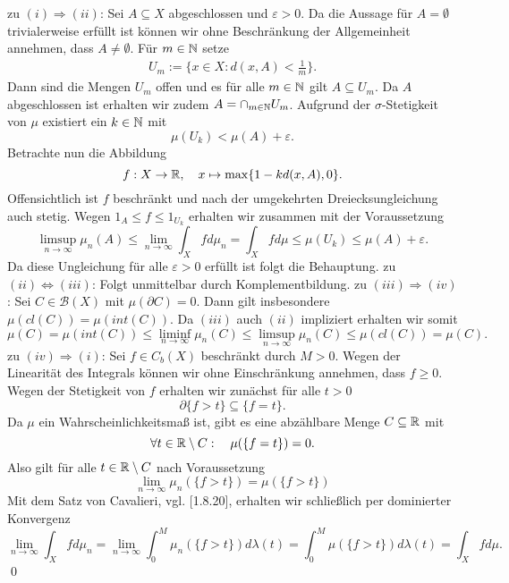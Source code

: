 \begin{proof*}
    zu $(i) \Rightarrow (ii)$: Sei $A \subseteq X$ abgeschlossen und $\varepsilon > 0$. Da die Aussage für $A = \emptyset$ trivialerweise erfüllt ist
    können wir ohne Beschränkung der Allgemeinheit annehmen, dass $A \neq \emptyset$. Für $m \in \mathbb{N}$ setze
    \begin{align*}
        U_m := \{x \in X: d(x,A) < \frac{1}{m}\}.
    \end{align*}
    Dann sind die Mengen $U_m$ offen und es für alle $m \in \mathbb{N}$ gilt $A \subseteq U_m$. Da $A$ abgeschlossen ist erhalten wir zudem $ A = \cap_{m \in \mathbb{N}} U_m$. 
    Aufgrund der $\sigma$-Stetigkeit von $\mu$ existiert ein $k \in \mathbb{N}$ mit 
    $$
        \mu(U_k) < \mu(A) + \varepsilon . 
    $$
    Betrachte nun die Abbildung 
    $$
        f:X \to \mathbb{R}, \quad x \mapsto \max\{1 - kd(x,A), 0\}.
    $$
    Offensichtlich ist $f$ beschränkt und nach der umgekehrten Dreiecksungleichung auch stetig. Wegen $1_A \leq f \leq 1_{U_k}$ erhalten wir zusammen mit der Voraussetzung 
    $$
    \limsup_{n \to \infty} \mu_n(A) \leq \lim_{n \to \infty} \int_X fd\mu_n = \int_X fd\mu \leq \mu(U_k) \leq \mu(A) + \varepsilon.
    $$
    Da diese Ungleichung für alle $\varepsilon > 0$ erfüllt ist folgt die Behauptung. 
    \newline 
    zu $(ii) \iff (iii)$: Folgt unmittelbar durch Komplementbildung. 
    \newline
    zu $(iii) \Rightarrow (iv)$: 
    Sei $C \in \mathcal{B}(X)$ mit $\mu(\partial C) = 0$. Dann gilt insbesondere $\mu(cl(C)) = \mu(int(C))$. Da $(iii)$ auch $(ii)$ impliziert erhalten wir somit
    $$
        \mu(C) = \mu(int(C)) \leq \liminf_{n \to \infty} \mu_n(C) \leq \limsup_{n \to \infty} \mu_n(C) \leq \mu(cl(C)) = \mu(C).
    $$
    \newline 
    zu $(iv) \Rightarrow (i)$: 
    Sei $f \in C_b(X)$ beschränkt durch $M > 0$. Wegen der Linearität des Integrals können wir ohne Einschränkung annehmen, dass $f \geq 0$. 
    Wegen der Stetigkeit von $f$ erhalten wir zunächst für alle $t > 0$
    $$
        \partial\{ f > t \} \subseteq \{f = t \}. 
    $$
    Da $\mu$ ein Wahrscheinlichkeitsmaß ist, gibt es eine abzählbare Menge $C \subseteq \mathbb{R}$ mit 
    $$
        \forall t \in \mathbb{R} \setminus C: \quad \mu(\{f = t \}) = 0. 
    $$
    Also gilt für alle $t \in \mathbb{R} \setminus C$ nach Voraussetzung 
    $$
        \lim_{n \to \infty} \mu_n(\{f > t \}) = \mu(\{f > t \})
    $$
    Mit dem Satz von Cavalieri, vgl. \cite{gs}[1.8.20], erhalten wir schließlich per dominierter Konvergenz
    $$
        \lim_{n \to \infty} \int_X fd\mu_n = \lim_{n \to \infty} \int_0^M \mu_n(\{f > t \})d\lambda(t) = \int_0^M \mu(\{f > t \}) d\lambda(t) = \int_Xfd\mu. 
    $$
    \qed 
\end{proof*}